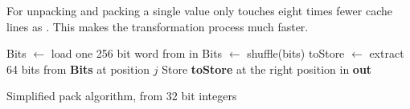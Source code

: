For \bs{} unpacking and packing a single value only touches eight times fewer
cache lines as \bwv{}. This makes the transformation process much faster.

\begin{algorithm}[h]
\begin{algorithmic}[1]
    \State Bits $\gets$ load one 256 bit word from in
    \State Bits $\gets$ shuffle(bits)
      \State toStore $\gets$ extract 64 bits from \textbf{Bits} at position $j$
      \State Store \textbf{toStore} at the right position in \textbf{out}
    \EndFor
  \EndFor
  \EndProcedure
\end{algorithmic}
\caption{Simplified \bs{} pack algorithm, from 32 bit integers}
\label{algo:packbs}
\end{algorithm}
